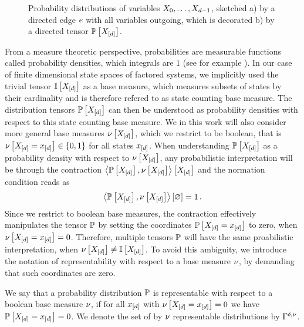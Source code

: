 \begin{figure}[hbt!]
    \begin{center}
        
    \end{center}
    \caption{Probability distributions of variables $X_{0},\ldots,X_{d-1}$, sketched
    a) by a directed edge $e$ with all variables outgoing, which is decorated b) by a directed tensor $\mathbb{P}\left[X_{[d]}\right]$.}\label{fig:probabilityTensor}
\end{figure}



From a measure theoretic perspective, probabilities are measurable functions called probability densities, which integrals are $1$ (see for example \cite{degroot_probability_2016}). %
In our case of finite dimensional state spaces of factored systems, we implicitly used the trivial tensor $\mathbb{I}\left[X_{[d]}\right]$ as a base measure, which measures subsets of states by their cardinality and is therefore refered to as state counting base measure.
The distribution tensors $\mathbb{P}\left[X_{[d]}\right]$ can then be understood as probability densities with respect to this state counting base measure.
We in this work will also consider more general base measures $\nu\left[X_{[d]}\right]$, which we restrict to be boolean, that is $\nu\left[X_{[d]}=x_{[d]}\right]\in\{0,1\}$ for all states $x_{[d]}$.
When understanding $\mathbb{P}\left[X_{[d]}\right]$ as a probability density with respect to $\nu\left[X_{[d]}\right]$, any probabilistic interpretation will be through the contraction $\left\langle \mathbb{P}\left[X_{[d]}\right],\nu\left[X_{[d]}\right]\right\rangle \left[ X_{[d]} \right]$ and the normation condition reads as
\begin{align*}
    \left\langle \mathbb{P}\left[X_{[d]}\right],\nu\left[X_{[d]}\right]\right\rangle \left[ \varnothing \right] = 1 \, .
\end{align*}
Since we restrict to boolean base measures, the contraction effectively manipulates the tensor $\mathbb{P}$ by setting the coordinates $\mathbb{P}\left[X_{[d]}=x_{[d]}\right]$ to zero, when $\nu\left[X_{[d]}=x_{[d]}\right]=0$.
Therefore, multiple tensors $\mathbb{P}$ will have the same proabilistic interpretation, when $\nu\left[X_{[d]}\right]\neq\mathbb{I}\left[X_{[d]}\right]$.
To avoid this ambiguity, we introduce the notation of representability with respect to a base measure $\nu$, by demanding that such coordinates are zero.

\begin{definition}
    \label{def:representationBaseMeasure}
    We say that a probability distribution $\mathbb{P}$ is representable with respect to a boolean base measure $\nu$, if for all $x_{[d]}$ with $\nu\left[X_{[d]}=x_{[d]}\right]=0$ we have $\mathbb{P}\left[X_{[d]}=x_{[d]}\right]=0$.
    We denote the set of by $\nu$ representable distributions by $\Gamma^{\delta,\nu}$.
\end{definition}


